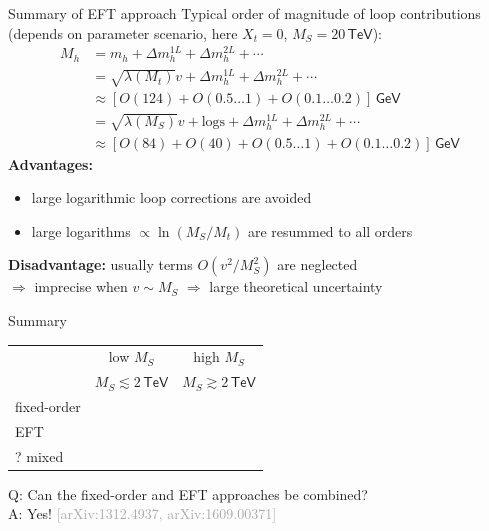 \documentclass[hyperref={pdfpagelabels=false},ngerman]{beamer}
\newcommand{\cmark}{\ding{51}}%
\newcommand{\xmark}{\ding{55}}%
\newcommand{\eh}[1]{\,\mathsf{#1}}
\newcommand{\ok}{\textcolor{darkgreen}{\cmark}}
\newcommand{\notok}{\textcolor{red}{\xmark}}
\newcommand{\MS}{\ensuremath{M_S}}
\newcommand{\mycite}[1]{\textcolor{darkgray}{\tiny [#1]}}
\renewcommand{\emph}{\textbf}
\begin{document}
\begin{frame}{Summary of EFT approach}
  Typical order of magnitude of loop contributions (depends on
  parameter scenario, here $X_t = 0$, $\MS = 20\eh{TeV}$):
  \begin{align*}
    M_h &= m_h + \Delta m_h^{1L} + \Delta m_h^{2L} + \cdots \\
    &= \sqrt{\lambda(M_t)} v + \Delta m_h^{1L} + \Delta m_h^{2L} + \cdots \\
    &\approx [O(124) + O(0.5\ldots 1) + O(0.1\ldots 0.2)] \eh{GeV}\\
    &= \sqrt{\lambda(\MS)} v + \text{logs} + \Delta m_h^{1L} + \Delta m_h^{2L} + \cdots \\
    &\approx [O(84) + O(40) + O(0.5\ldots 1) + O(0.1\ldots 0.2)] \eh{GeV}
  \end{align*}
  \emph{Advantages:}
  \begin{itemize}
  \item large logarithmic loop corrections are avoided
  \item large logarithms $\propto\ln(M_S/M_t)$ are resummed to all orders
  \end{itemize}
  \emph{Disadvantage:} usually terms $O(v^2/M_S^2)$ are neglected \\
  $\Rightarrow$ imprecise when $v \sim \MS$
  $\Rightarrow$ large theoretical uncertainty
\end{frame}

\begin{frame}{Summary}
  \begin{center}
    \begin{tabular}{lcc}
      \toprule
                  & low $\MS$ & high $\MS$ \\
                  & $\MS \lesssim 2\eh{TeV}$ & $\MS \gtrsim 2\eh{TeV}$ \\
      \midrule
      fixed-order & \ok       & \notok     \\
      EFT         & \notok    & \ok        \\
      ? mixed     & \ok       & \ok        \\
      \bottomrule
    \end{tabular}
  \end{center}
  \vspace{2em}
  Q: Can the fixed-order and EFT approaches be combined? \\[1em]
  A: Yes!  \mycite{arXiv:1312.4937, arXiv:1609.00371}
\end{frame}

\end{document}
